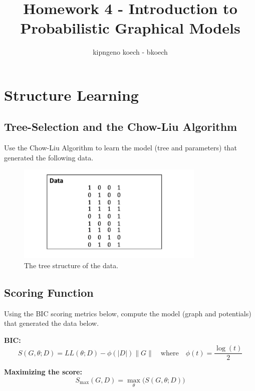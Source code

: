 \documentclass[a3paper,12pt]{extarticle} %
\begin{document}
\author{kipngeno koech - bkoech}
\title{Homework 4 - Introduction to Probabilistic Graphical Models}   
\maketitle

\medskip

\maketitle

\section{Structure Learning}
\subsection{Tree-Selection and the Chow-Liu Algorithm}
Use the Chow-Liu Algorithm to learn the model (tree and parameters) that generated the following data.

\begin{figure}[H]
\centering
\includegraphics[width=0.8\textwidth]{q1.png}
\caption{The tree structure of the data.}
\label{fig:tree}
\end{figure}

\subsection{Scoring Function}
Using the BIC scoring metrics below, compute the model (graph and potentials) that generated the data below. 

\textbf{BIC:}
\[
S(G, \theta; D) = LL(\theta; D) - \phi(|D|)\|G\| \quad \text{where} \quad \phi(t) = \frac{\log(t)}{2}
\]

\textbf{Maximizing the score:}
\[
S_{\text{max}}(G, D) = \max_{\theta} \big(S(G, \theta; D)\big)
\]
\end{document}
